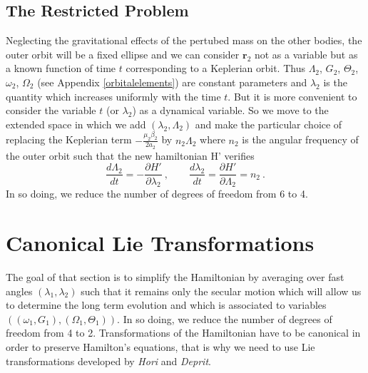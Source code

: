 \documentclass[a4paper]{article}
\begin{document}
\subsection{The Restricted Problem}
Neglecting the gravitational effects of the pertubed mass on the other bodies, the outer orbit will be a fixed ellipse and we can consider $\mathbf r_{2}$ not as a variable but as a known function of time $t$ corresponding to a Keplerian orbit. Thus $\Lambda_{2}$, $G_{2}$, $\Theta_{2}$, $\omega_{2}$, $\Omega_{2}$ (see Appendix \ref{orbitalelements}) are constant parameters and $\lambda_{2}$ is the quantity which increases uniformly with the time $t$. But it is more convenient to consider the variable $t$ (or $\lambda_{2}$) as a dynamical variable. So we move to the extended space in which we add $(\lambda_{2},\Lambda_{2})$ and make the particular choice of replacing the Keplerian term $-\frac{\mu_{2}\beta_{2}}{2a_{2}}$ by $n_{2}\Lambda_{2}$ where $n_{2}$ is the angular frequency of the outer orbit such that the new hamiltonian H' verifies
\begin{equation}
\frac{d \Lambda_{2}}{d t}=-\frac{\partial H'}{\partial \lambda_{2}} \ , \qquad \frac{d \lambda_{2}}{d t}=\frac{\partial H'}{\partial \Lambda_{2}}=n_{2} \ .
\end{equation}
In so doing, we reduce the number of degrees of freedom from 6 to 4.
\section{Canonical Lie Transformations}
The goal of that section is to simplify the Hamiltonian by averaging over fast angles $(\lambda_{1}, \lambda_{2})$ such that it remains only the secular motion which will allow us to determine the long term evolution and which is associated to variables $\left( (\omega_{1}, G_{1}), (\Omega_{1}, \Theta_{1}) \right)$. 
In so doing, we reduce the number of degrees of freedom from 4 to 2.
Transformations of the Hamiltonian have to be canonical in order to preserve Hamilton's equations, that is why we need to use Lie transformations developed by \textit{Hori} and \textit{Deprit}.
\label{clt}
\end{document}
